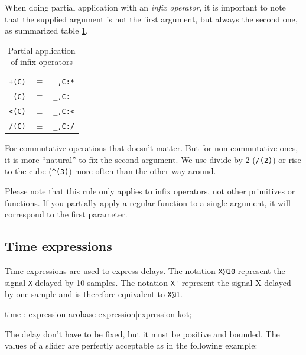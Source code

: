 When doing partial application with an \emph{infix operator}, it is important to note that the supplied argument is not the first argument, but always the second one, as summarized table \ref{tab:partialrules}. 


\begin{table}[h]
	\begin{center}
	\begin{tabular}{|rcl|}
	\hline
	\lstinline'+(C)' & $\equiv$ & \lstinline'_,C:*'\\
	\lstinline'-(C)' & $\equiv$ & \lstinline'_,C:-'\\
	\lstinline'<(C)' & $\equiv$ & \lstinline'_,C:<'\\
	\lstinline'/(C)' & $\equiv$ & \lstinline'_,C:/'\\
	\hline
	\end{tabular}
	\end{center}
	\caption{Partial application of infix operators}
	\label{tab:partialrules}
\end{table}

For commutative operations that doesn't matter. But for non-commutative ones, it is more ``natural'' to fix the second argument.  We use divide by 2 (\lstinline'/(2)') or rise to the cube (\lstinline'^(3)') more often than the other way around.

Please note that this rule only applies to infix operators, not other primitives or functions. If you partially apply a regular function to a single argument, it will correspond to the first parameter.

\subsection{Time expressions}

Time expressions are used to express delays. The notation \lstinline'X@10' represent the signal \lstinline'X' delayed by 10 samples. The notation \lstinline"X'" represent the signal X delayed by one sample and is therefore equivalent to \lstinline'X@1'.

\begin{rail}
time : expression arobase expression|expression kot; 
\end{rail}

The delay don't have to be fixed, but it must be positive and bounded. The values of a slider are perfectly acceptable as in the following example:


